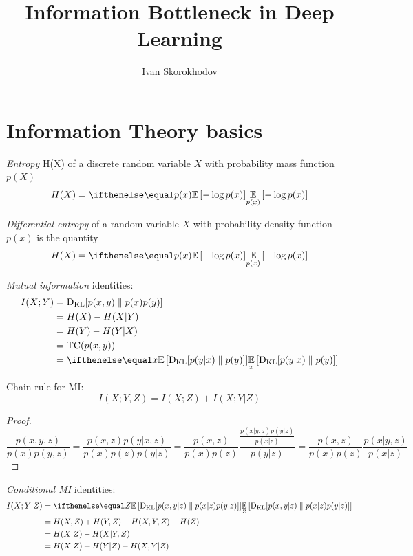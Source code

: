 \documentclass{article}
\title{Information Bottleneck in Deep Learning}
\author{Ivan Skorokhodov}
\begin{document}

\section{Information Theory basics}

\begin{definition}
\textit{Entropy} H(X) of a discrete random variable $X$ with probability mass function $p(X)$
\[
H(X) = \expect[p(x)]{-\log p(x)}
\]
\end{definition}

\begin{definition}
\textit{Differential entropy} of a random variable $X$ with probability density function $p(x)$ is the quantity
\[
H(X) = \expect[p(x)]{-\log p(x)}
\]
\end{definition}

\begin{definition}
\textit{Mutual information} identities:
\[
\begin{split}
I(X;Y)
&= \kl{p(x,y)}{p(x)p(y)} \\
&= H(X) - H(X|Y) \\
&= H(Y) - H(Y|X) \\
&= \text{TC}(p(x,y)) \\
&= \expect[x]{\kl{p(y|x)}{p(y)}}
\end{split}
\]
\end{definition}

\begin{proposition}
Chain rule for MI:
\[
I(X ; Y, Z)=I(X ; Z) + I(X ; Y | Z)
\]
\end{proposition}
\begin{proof}
\[
\frac{p(x,y,z)}{p(x)p(y,z)} = \frac{p(x,z)p(y|x,z)}{p(x)p(z)p(y|z)} = \frac{p(x,z)}{p(x)p(z)} \frac{\frac{p(x|y,z)p(y|z)}{p(x|z)}}{p(y|z)} = \frac{p(x,z)}{p(x)p(z)} \frac{p(x|y,z)}{p(x|z)}
\]
\end{proof}

\begin{definition}
\textit{Conditional MI} identities:
\[
\begin{split}
I(X ; Y|Z)
&= \expect[Z]{\kl{p(x,y|z)}{p(x|z)p(y|z)}} \\
&= H(X, Z) + H(Y, Z) - H(X, Y, Z) - H(Z) \\
&= H(X|Z) - H(X|Y, Z) \\
&= H(X|Z) + H(Y|Z) - H(X, Y|Z) \\
\end{split}
\]
\end{definition}
\end{document}
